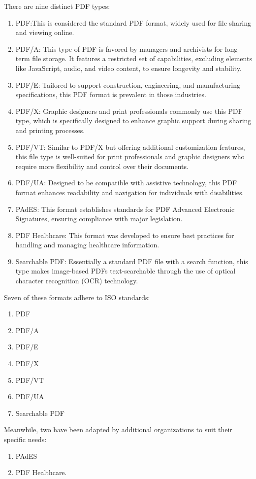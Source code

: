 There are nine distinct PDF types:
\begin{enumerate}
\item PDF:This is considered the standard PDF format, widely used for file sharing and viewing online.

\item PDF/A: This type of PDF is favored by managers and archivists for long-term file storage. It features a restricted set of capabilities, excluding elements like JavaScript, audio, and video content, to ensure longevity and stability.

\item PDF/E: Tailored to support construction, engineering, and manufacturing specifications, this PDF format is prevalent in those industries.

\item PDF/X: Graphic designers and print professionals commonly use this PDF type, which is specifically designed to enhance graphic support during sharing and printing processes.

\item PDF/VT: Similar to PDF/X but offering additional customization features, this file type is well-suited for print professionals and graphic designers who require more flexibility and control over their documents.

\item PDF/UA: Designed to be compatible with assistive technology, this PDF format enhances readability and navigation for individuals with disabilities.

\item PAdES: This format establishes standards for PDF Advanced Electronic Signatures, ensuring compliance with major legislation.

\item PDF Healthcare: This format was developed to ensure best practices for handling and managing healthcare information.

\item Searchable PDF: Essentially a standard PDF file with a search function, this type makes image-based PDFs text-searchable through the use of optical character recognition (OCR) technology.
\end{enumerate}

Seven of these formats adhere to ISO standards:
\begin{enumerate}
\item PDF
\item PDF/A
\item PDF/E
\item PDF/X
\item PDF/VT
\item PDF/UA
\item Searchable PDF
\end{enumerate}
Meanwhile, two have been adapted by additional organizations to suit their specific needs:
\begin{enumerate}
\item PAdES
\item PDF Healthcare.
\end{enumerate}
\cite{Lozano:2024}

